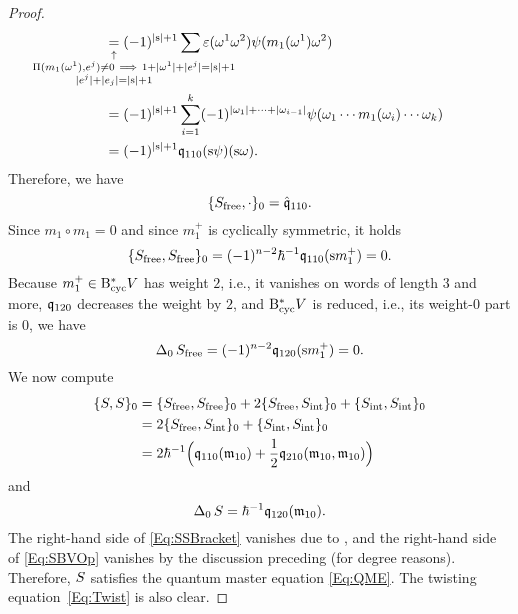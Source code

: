 \documentclass[\MainFolder/Text.tex]{subfiles}
\begin{document}
\begin{proof}
\begin{align}
&\qquad\underset{\mathclap{\substack{\uparrow\rule{0pt}{1.5ex} \\ \hspace{1cm}\Pair(m_1(\omega^1),e^j)\neq 0\ \Implies\ 1 + \Abs{\omega^1} + \Abs{e^j} = \Abs{\Susp} + 1 \\ 
\Abs{e^j} + \Abs{e_j} = \Abs{\Susp} + 1
}}}{=} (-1)^{\Abs{\Susp} + 1} \sum \varepsilon(\omega^1 \omega^2) \psi(m_1(\omega^1)\omega^2) \nonumber\\
&\qquad = (-1)^{\Abs{\Susp} + 1} \sum_{i=1}^k (-1)^{\Abs{\omega_1} + \dotsb + \Abs{\omega_{i-1}}} \psi(\omega_1 \dotsb m_1(\omega_i) \dotsb \omega_k) \nonumber\\
&\qquad = (-1)^{\Abs{\Susp} + 1}\OPQ_{110}(\Susp \psi)(\Susp \omega).
\end{align}
Therefore, we have 
\begin{equation}\label{Eq:FreeActionBracket}
 \{S_{\mathrm{free}},\cdot\}_0 = \hat{\mathfrak{q}}_{110}.
\end{equation}
Since $m_1 \circ m_1 = 0$ and since $m_1^+$ is cyclically symmetric, it holds
\begin{equation*}
\{S_{\mathrm{free}},S_{\mathrm{free}}\}_0 = (-1)^{n-2}\hbar^{-1}\mathfrak{q}_{110}(\mathrm{s} m_1^+) = 0.
\end{equation*}
Because $m_1^+ \in \mathrm{B}_{\mathrm{cyc}}^* V$ has weight $2$, i.e., it vanishes on words of length $3$ and more, $\mathfrak{q}_{120}$ decreases the weight by $2$, and $\mathrm{B}_{\mathrm{cyc}}^* V$ is reduced, i.e., its weight-$0$ part is $0$, we have
\begin{equation*}
\operatorname{\Delta}_0 S_{\mathrm{free}} = (-1)^{n-2}\mathfrak{q}_{120}(\mathrm{s} m_1^+) = 0.
\end{equation*}
We now compute
\begin{equation}\label{Eq:SSBracket}\begin{aligned}
\{S,S\}_0 &= \{S_{\mathrm{free}},S_{\mathrm{free}}\}_0 + 2 \{S_{\mathrm{free}},S_{\mathrm{int}}\}_0 + \{S_{\mathrm{int}},S_{\mathrm{int}}\}_0 \\
& = 2 \{S_{\mathrm{free}},S_{\mathrm{int}}\}_0 + \{S_{\mathrm{int}},S_{\mathrm{int}}\}_0  \\
& = 2\hbar^{-1}\Bigl(\mathfrak{q}_{110}(\mathfrak{m}_{10}) + \frac{1}{2}\mathfrak{q}_{210}(\mathfrak{m}_{10},\mathfrak{m}_{10})\Bigr)
\end{aligned}\end{equation}
and
\begin{equation}\label{Eq:SBVOp}
 \operatorname{\Delta}_0 S = \hbar^{-1}\mathfrak{q}_{120}(\mathfrak{m}_{10}).
\end{equation}
The right-hand side of \eqref{Eq:SSBracket} vanishes due to \cite[Proposition~12.3]{Cieliebak2015}, and the right-hand side of \eqref{Eq:SBVOp} vanishes by the discussion preceding \cite[Proposition 12.5]{Cieliebak2015} (for degree reasons). Therefore, $S$ satisfies the quantum master equation \eqref{Eq:QME}. The twisting equation~\eqref{Eq:Twist} is also clear.
\end{proof}
\end{document}
